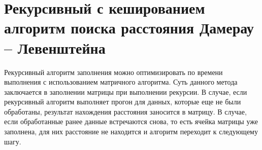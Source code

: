 \section{Рекурсивный с кешированием алгоритм поиска расстояния Дамерау -- Левенштейна}

Рекурсивный алгоритм заполнения можно оптимизировать по времени
выполнения с использованием матричного алгоритма. Суть данного метода
заключается в заполнении матрицы при выполнении рекурсии. В случае, если рекурсивный алгоритм выполняет прогон для данных, которые еще не
были обработаны, результат нахождения расстояния заносится в матрицу. В
случае, если обработанные ранее данные встречаются снова, то есть ячейка
матрицы уже заполнена, для них расстояние не находится и алгоритм переходит к следующему шагу.

\clearpage
